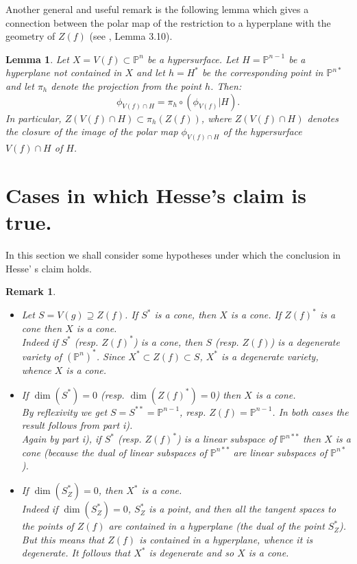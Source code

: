 \documentclass[11pt,a4paper]{amsart}
\newtheorem{rem}[theorem]{Remark}
\newtheorem{lemma}[theorem]{Lemma}
\newcommand{\PP}{ \mathbb{P}}
\newcommand{\pdual}{(\mathbb{P}^n)^*}
\begin{document}
Another general and useful remark is the following lemma which gives a connection between the polar map of the restriction to a hyperplane with the geometry of $Z(f)$ (see \cite{CilibertoRussoSimis}, Lemma 3.10).
\begin{lemma}\label{projection}
Let $X=V(f)\subset\mathbb{P}^n$ be a hypersurface. Let $H=\mathbb{P}^{n-1}$ be a hyperplane not contained in $X$ and let $h=H^*$ be the corresponding point in $\mathbb{P}^{n*}$ and let $\pi_h$ denote the projection from the point $h$. Then:
$$\phi_{V(f)\cap H}=\pi_h\circ (\phi_{V(f)}|H).$$
In particular, $Z(V(f)\cap H)\subset \pi_h(Z(f))$, where  $Z(V(f)\cap H)$ denotes the closure of the image of the polar map $\phi_{V(f)\cap H}$ of the hypersurface $V(f)\cap H$ of $H$.
\end{lemma}
\section{Cases in which Hesse's claim is true.}
In this section we shall consider some hypotheses under which the
conclusion in Hesse' s claim holds.
\begin{rem}\label{rem: S* o Z(f)* cone X cone} {\em
\begin{itemize}
\item [i)] \textit{ Let $S=V(g)\supseteq Z(f)$. If $S^*$ is a
cone, then $X$ is a cone. If $Z(f)^*$ is a
cone then $X$ is a cone.} \\
Indeed if $S^*$ (resp. $Z(f)^*$) is a cone, then $S$ (resp.
$Z(f)$) is a degenerate variety of $\pdual$. Since $X^*\subset
Z(f)\subset S$, $X^*$ is a degenerate variety, whence $X$ is a
cone. \item [ii)] \textit{If $\dim
(S^*)=0$ {\rm (}resp. $\dim(Z(f)^*)=0${\rm)} then $X$ is a cone.}\\
By reflexivity we get $S=S^{**}=\PP^{n-1}$, resp.
$Z(f)=\PP^{n-1}$. In both cases the result follows from part i).\\
Again by part i), \textit{if $S^*$ {\rm(}resp. $Z(f)^*${\rm)} is a linear
subspace of $\mathbb{P}^{n**}$ then $X$ is a cone} (because the
dual of linear subspaces of $\mathbb{P}^{n**}$ are linear
subspaces of $\PP^{n*}$).
\item [iii)] \textit{If $\dim (S^*_Z)=0$, then $X^*$ is a cone.}\\
Indeed if $\dim (S^*_Z)=0$, $S^*_Z$ is a point, and then all the tangent
spaces to the points of $Z(f)$ are contained in a hyperplane (the
dual of the point $S^*_Z$). But this means that $Z(f)$ is contained in
a hyperplane, whence it is degenerate. It follows  that $X^*$ is
degenerate and so $X$ is a cone.
\end{itemize}
}\end{rem}
\end{document}
